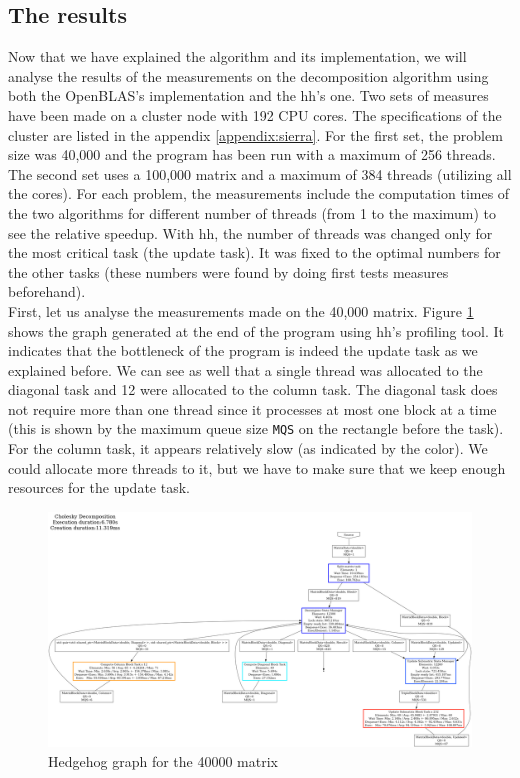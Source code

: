 \clearpage{}
\subsection{The results}
\label{sec:chores}

Now that we have explained the algorithm and its implementation, we will analyse
the results of the measurements on the decomposition algorithm using both the
OpenBLAS's implementation and the \gls{hh}'s one. Two sets of measures have been
made on a cluster node with 192 CPU cores. The specifications of the cluster are
listed in the appendix \ref{appendix:sierra}. For the first set, the problem
size was 40,000 and the program has been run with a maximum of 256 threads.
The second set uses a 100,000 matrix and a maximum of 384 threads (utilizing all
the cores). For each problem, the measurements include the computation times of
the two algorithms for different number of threads (from 1 to the maximum) to see
the relative speedup. With \gls{hh}, the number of threads was changed only for
the most critical task (the update task). It was fixed to the optimal numbers
for the other tasks (these numbers were found by doing first tests measures
beforehand).\\

First, let us analyse the measurements made on the 40,000 matrix. Figure
\ref{fig:40000graph} shows the graph generated at the end of the program using
\gls{hh}'s profiling tool. It indicates that the bottleneck of the program is
indeed the update task as we explained before. We can see as well that a single
thread was allocated to the diagonal task and 12 were allocated to the column
task. The diagonal task does not require more than one thread since it processes
at most one block at a time (this is shown by the maximum queue size
\texttt{MQS} on the rectangle before the task). For the column task, it appears
relatively slow (as indicated by the color). We could allocate more threads to
it, but we have to make sure that we keep enough resources for the update task.

\begin{figure}[!ht]
  \begin{center}
    \includegraphics[scale=0.15]{img/cho-img/40000.png}
    \caption{Hedgehog graph for the 40000 matrix}
    \label{fig:40000graph}
  \end{center}
\end{figure}

